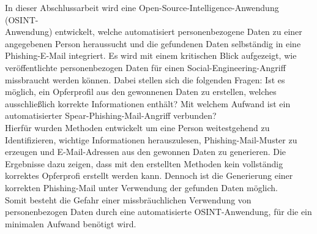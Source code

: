 \label{cha:kurzfassung} 
In dieser Abschlussarbeit wird eine Open-Source-Intelligence-Anwendung (OSINT-\\Anwendung) entwickelt, welche automatisiert personenbezogene Daten zu einer angegebenen Person heraussucht und die gefundenen Daten selbständig in eine Phishing-E-Mail integriert. Es wird mit einem kritischen Blick aufgezeigt, wie veröffentlichte personenbezogen Daten für einen Social-Engineering-Angriff missbraucht werden können. Dabei stellen sich die folgenden Fragen: Ist es möglich, ein Opferprofil aus den gewonnenen Daten zu erstellen, welches ausschließlich korrekte Informationen enthält? Mit welchem Aufwand ist ein automatisierter Spear-Phishing-Mail-Angriff verbunden?\\
Hierfür wurden Methoden entwickelt um eine Person weitestgehend zu Identifizieren, wichtige Informationen herauszulesen, Phishing-Mail-Muster zu erzeugen und E-Mail-Adressen aus den gewonnen Daten zu generieren. Die Ergebnisse dazu zeigen, dass mit den erstellten Methoden kein vollständig korrektes Opferprofi erstellt werden kann. Dennoch ist die Generierung einer korrekten Phishing-Mail unter Verwendung der gefunden Daten möglich.\\
Somit besteht die Gefahr einer missbräuchlichen Verwendung von personenbezogen Daten durch eine automatisierte OSINT-Anwendung, für die ein minimalen Aufwand benötigt wird.



